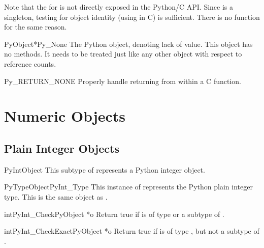 Note that the  for  is not directly
exposed in the Python/C API.  Since  is a singleton,
testing for object identity (using \samp{==} in C) is sufficient.
There is no  function for the same reason.

\begin{cvardesc}{PyObject*}{Py_None}
  The Python  object, denoting lack of value.  This object
  has no methods.  It needs to be treated just like any other object
  with respect to reference counts.
\end{cvardesc}

\begin{csimplemacrodesc}{Py_RETURN_NONE}
  Properly handle returning  from within a C function.
\end{csimplemacrodesc}


\section{Numeric Objects \label{numericObjects}}



\subsection{Plain Integer Objects \label{intObjects}}

\begin{ctypedesc}{PyIntObject}
  This subtype of  represents a Python integer
  object.
\end{ctypedesc}

\begin{cvardesc}{PyTypeObject}{PyInt_Type}
  This instance of  represents the Python plain
  integer type.  This is the same object as .
\end{cvardesc}

\begin{cfuncdesc}{int}{PyInt_Check}{PyObject *o}
  Return true if  is of type  or a subtype
  of .
\end{cfuncdesc}

\begin{cfuncdesc}{int}{PyInt_CheckExact}{PyObject *o}
  Return true if  is of type , but not a
  subtype of .
\end{cfuncdesc}

